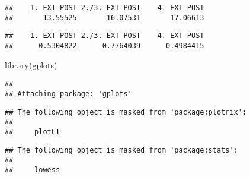 \documentclass[
]{book}
\newenvironment{Shaded}{\begin{snugshade}}{\end{snugshade}}
\newcommand{\CommentTok}[1]{\textcolor[rgb]{0.56,0.35,0.01}{\textit{#1}}}
\newcommand{\FunctionTok}[1]{\textcolor[rgb]{0.00,0.00,0.00}{#1}}
\newcommand{\NormalTok}[1]{#1}
\newcommand{\SpecialCharTok}[1]{\textcolor[rgb]{0.00,0.00,0.00}{#1}}
\begin{document}
\begin{Shaded}
\end{Shaded}

\begin{verbatim}
##    1. EXT POST 2./3. EXT POST    4. EXT POST 
##       13.55525       16.07531       17.06613
\end{verbatim}

\begin{Shaded}
\end{Shaded}

\begin{verbatim}
##    1. EXT POST 2./3. EXT POST    4. EXT POST 
##      0.5304822      0.7764039      0.4984415
\end{verbatim}

\begin{Shaded}
\begin{Highlighting}[]
\FunctionTok{library}\NormalTok{(gplots)}
\end{Highlighting}
\end{Shaded}

\begin{verbatim}
## 
## Attaching package: 'gplots'
\end{verbatim}

\begin{verbatim}
## The following object is masked from 'package:plotrix':
## 
##     plotCI
\end{verbatim}

\begin{verbatim}
## The following object is masked from 'package:stats':
## 
##     lowess
\end{verbatim}
\end{document}
